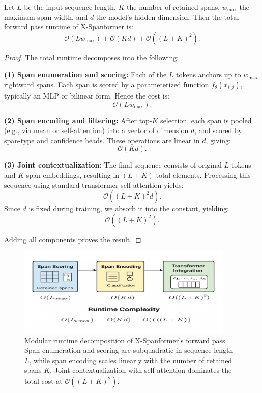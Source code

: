 \begin{proposition}
\label{prop:runtime}
Let \(L\) be the input sequence length, \(K\) the number of retained spans, \(w_{\max}\) the maximum span width, and \(d\) the model's hidden dimension. Then the total forward pass runtime of X-Spanformer is:
\[
\mathcal{O}(L w_{\max}) + \mathcal{O}(K d) + \mathcal{O}((L + K)^2).
\]
\end{proposition}

\begin{proof}
The total runtime decomposes into the following:

\textbf{(1) Span enumeration and scoring:} Each of the \(L\) tokens anchors up to \(w_{\max}\) rightward spans. Each span is scored by a parameterized function \(f_\theta(x_{i:j})\), typically an MLP or bilinear form. Hence the cost is:
\[
\mathcal{O}(L w_{\max}).
\]

\textbf{(2) Span encoding and filtering:} After top-\(K\) selection, each span is pooled (e.g., via mean or self-attention) into a vector of dimension \(d\), and scored by span-type and confidence heads. These operations are linear in \(d\), giving:
\[
\mathcal{O}(K d).
\]

\textbf{(3) Joint contextualization:} The final sequence consists of original \(L\) tokens and \(K\) span embeddings, resulting in \((L + K)\) total elements. Processing this sequence using standard transformer self-attention \cite{vaswani2017attention} yields:
\[
\mathcal{O}((L + K)^2 d).
\]
Since \(d\) is fixed during training, we absorb it into the constant, yielding:
\[
\mathcal{O}((L + K)^2).
\]

Adding all components proves the result.
\end{proof}

\begin{figure}[H]
  \centering
  \includegraphics[width=0.92\textwidth]{figures/figure_2.png}
  \caption{Modular runtime decomposition of X-Spanformer's forward pass. Span enumeration and scoring are subquadratic in sequence length \(L\), while span encoding scales linearly with the number of retained spans \(K\). Joint contextualization with self-attention dominates the total cost at \( \mathcal{O}((L + K)^2) \).}
  \label{fig:runtime_decomposition}
\end{figure}